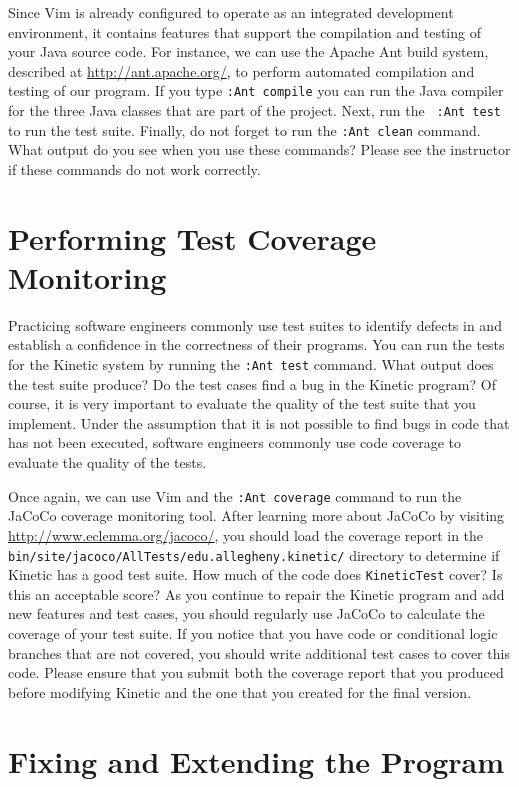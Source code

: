 Since Vim is already configured to operate as an integrated development environment, it contains features that support
the compilation and testing of your Java source code.  For instance, we can use the Apache Ant build system, described
at \url{http://ant.apache.org/}, to perform automated compilation and testing of our program. If you type {\tt :Ant
	compile} you can run the Java compiler for the three Java classes that are part of the project.  Next, run the {\tt
:Ant test} to run the test suite.  Finally, do not forget to run the {\tt :Ant clean} command. What output do you see
when you use these commands? Please see the instructor if these commands do not work correctly.

\section*{Performing Test Coverage Monitoring}

Practicing software engineers commonly use test suites to identify defects in and establish a confidence in the
correctness of their programs.  You can run the tests for the Kinetic system by running the {\tt :Ant test} command.
What output does the test suite produce?  Do the test cases find a bug in the Kinetic program?  Of course, it is very
important to evaluate the quality of the test suite that you implement.  Under the assumption that it is not possible to
find bugs in code that has not been executed, software engineers commonly use code coverage to evaluate the quality of
the tests.  

Once again, we can use Vim and the {\tt :Ant coverage} command to run the JaCoCo coverage monitoring tool.  After
learning more about JaCoCo by visiting \url{http://www.eclemma.org/jacoco/}, you should load the coverage report in the
{\tt bin/site/jacoco/AllTests/edu.allegheny.kinetic/} directory to determine if Kinetic has a good test suite.
How much of the code does {\tt KineticTest} cover?  Is this an acceptable score?  As you continue to repair the Kinetic
program and add new features and test cases, you should regularly use JaCoCo to calculate the coverage of your test
suite.  If you notice that you have code or conditional logic branches that are not covered, you should write additional
test cases to cover this code.  Please ensure that you submit both the coverage report that you produced before
modifying Kinetic and the one that you created for the final version.

\section*{Fixing and Extending the Program}

